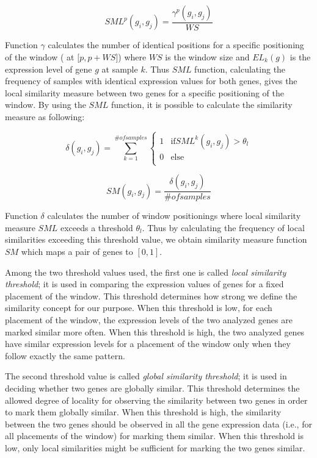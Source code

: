 \begin{equation}
SML^p(g_i,g_j) = \frac{\gamma^p(g_i,g_j)}{WS}
\end{equation}

Function $\gamma$ calculates the number of identical positions for a specific positioning of the window ( at 
$[p, p+ WS$])  where $WS$ is the window size and $EL_k(g)$ is the expression level of gene $g$ at sample 
$k$. Thus $SML$ function, calculating the frequency of samples with identical expression values for both genes,
 gives the local similarity measure between two genes for a specific positioning 
of the window. By using the $SML$ function, it is possible to calculate the similarity measure as following:

\begin{equation}
\delta(g_i,g_j)=\sum_{k=1}^{\# of samples} 
\begin{cases}
1 & \text{if} SML^k(g_i,g_j) > \theta_l \\
0 & \text{else}\\
\end{cases}
\end{equation}

\begin{equation}
SM(g_i,g_j) = \frac{\delta(g_i,g_j)}{\# of samples}
\end{equation}

Function $\delta$ calculates the number of window positionings where local similarity measure $SML$ 
exceeds a threshold $\theta_l$. Thus by calculating the frequency of local similarities exceeding this 
threshold value, we obtain similarity measure function $SM$ which maps a pair of genes to $[0,1]$.

Among the two threshold values used, the first one is called \emph{local similarity threshold}; it is used in
comparing the expression values of genes for a fixed placement of the window. This threshold determines how
strong we define the similarity concept for our purpose. When this threshold is low, for each placement of
the window, the expression levels of the two analyzed genes are marked similar more often. When this
threshold is high, the two analyzed genes have similar expression levels for a placement of the window only
when they follow exactly the same pattern.

The second threshold value is called \emph{global similarity threshold}; it is used in deciding whether two
genes are globally similar. This threshold determines the allowed degree of locality for observing the
similarity between two genes in order to mark them globally similar. When this threshold is high, the
similarity between the two genes should be observed in all the gene expression data (i.e., for all placements
of the window) for marking them similar. When this threshold is low, only local similarities might be
sufficient for marking the two genes similar.


